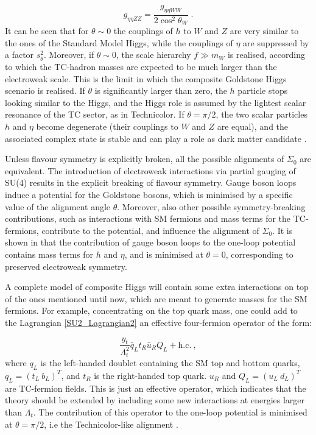 \begin{equation}
g_{\eta \eta ZZ} = \frac{g_{\eta \eta WW}}{2 \cos^2 \theta_W}  \; .
\end{equation}
%
It can be seen that for $\theta \sim 0$ the couplings of  $h$ to $W$ and $Z$ are very similar to the ones of the Standard Model Higgs, while the couplings of $\eta$ are suppressed by a factor $s_{\theta}^2$. Moreover, if $\theta \sim 0$, the scale hierarchy $f \gg m_W$ is realised,  according to which the TC-hadron masses are expected to be much larger than the electroweak scale. This is the limit in which the composite Goldstone Higgs scenario is realised. If $\theta$ is significantly larger than zero, the $h$ particle stops looking similar to the Higgs, and the Higgs role is assumed by the lightest scalar resonance of the TC sector, as in Technicolor. If $\theta = \pi/2$, the two scalar particles $h$ and $\eta$ become degenerate (their couplings to $W$ and $Z$ are equal), and the associated complex state is stable and can play a role as dark matter candidate \cite{Cacciapaglia:2014uja}.

Unless flavour symmetry is explicitly broken, all the possible alignments of $\Sigma_0$ are equivalent. The introduction of electroweak interactions via partial gauging of SU(4) results in the explicit breaking of flavour symmetry. Gauge boson loops induce a potential for the Goldstone bosons, which is minimised by a specific value of the alignment angle $\theta$. Moreover, also other possible symmetry-breaking contributions, such as interactions with SM fermions and mass terms for the TC-fermions, contribute to the potential, and influence the alignment of $\Sigma_0$. It is shown in \cite{Cacciapaglia:2014uja} that the contribution of gauge boson loops to the one-loop potential contains mass terms for $h$ and $\eta$, and is minimised at $\theta = 0$, corresponding to preserved electroweak symmetry.


A complete model of composite Higgs will contain some extra interactions on top of the ones mentioned until now, which are meant to generate masses for the SM fermions. For example, concentrating on the top quark mass, one could add to the Lagrangian \ref{SU2_Lagrangian2} an effective four-fermion operator of the form:

\begin{equation}
\frac{y_t}{\Lambda_t^2} \bar q_L t_R \bar u_R  Q_L  + \mathrm{h.c.} \: ,
\label{}
\end{equation}
%
where $q_L$ is the left-handed doublet containing the SM top and bottom quarks, $q_L = (t_L  \: b_L)^T$, and $t_R$ is the right-handed top quark. $u_R$ and $Q_L = (u_L \: d_L)^T$ are TC-fermion fields. This is just an effective operator, which indicates that the theory should be extended by including some new interactions at energies larger than $\Lambda_t$. The contribution of this operator to the one-loop potential is minimised at $\theta = \pi/2$, i.e the Technicolor-like alignment \cite{Cacciapaglia:2014uja}.

